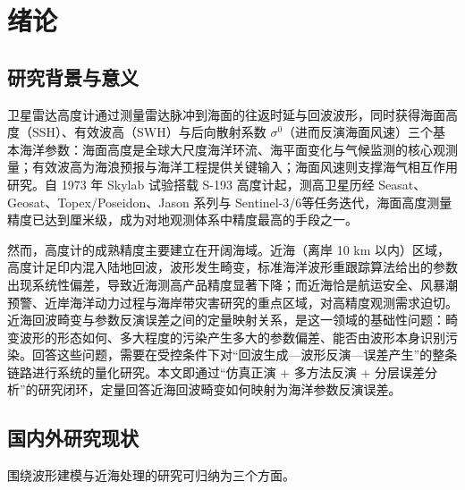 \documentclass[a4paper]{article}
\newcommand{\song}{\CJKfamily{song}}
\newcommand{\xiaosihao}{\fontsize{12pt}{18pt}\selectfont}
\newcommand\seccontent{
	\song
	\xiaosihao
    \setlength{\parindent}{2em}
    \setlength{\parskip}{0pt}
    }
\begin{document}
\clearpage
\setcounter{page}{1}
\renewcommand{\thepage}{\arabic{page}}

\seccontent

\section{绪论}
\label{chap:intro}

\subsection{研究背景与意义}
\label{sec:background}
卫星雷达高度计通过测量雷达脉冲到海面的往返时延与回波波形，同时获得海面高度（SSH）、有效波高（SWH）与后向散射系数 $\sigma^0$（进而反演海面风速）三个基本海洋参数\cite{chelton2001}：海面高度是全球大尺度海洋环流、海平面变化与气候监测的核心观测量；有效波高为海浪预报与海洋工程提供关键输入；海面风速则支撑海气相互作用研究。自 1973 年 Skylab 试验搭载 S-193 高度计\cite{mcgoogan1974}起，测高卫星历经 Seasat\cite{tapley1982}、Geosat\cite{macarthur1987}、Topex/Poseidon\cite{fu1994}、Jason 系列\cite{menard2003,beckley2010,zaouche2010}与 Sentinel-3/6\cite{donlon2012}等任务迭代，海面高度测量精度已达到厘米级，成为对地观测体系中精度最高的手段之一。

然而，高度计的成熟精度主要建立在开阔海域。近海（离岸 10 km 以内）区域，高度计足印内混入陆地回波，波形发生畸变，标准海洋波形重跟踪算法给出的参数出现系统性偏差，导致近海测高产品精度显著下降\cite{vignudelli2011,deng2006}；而近海恰是航运安全、风暴潮预警、近岸海洋动力过程与海岸带灾害研究的重点区域，对高精度观测需求迫切。近海回波畸变与参数反演误差之间的定量映射关系，是这一领域的基础性问题：畸变波形的形态如何、多大程度的污染产生多大的参数偏差、能否由波形本身识别污染。回答这些问题，需要在受控条件下对“回波生成—波形反演—误差产生”的整条链路进行系统的量化研究。本文即通过“仿真正演 + 多方法反演 + 分层误差分析”的研究闭环，定量回答近海回波畸变如何映射为海洋参数反演误差。

\subsection{国内外研究现状}
\label{sec:related}
围绕波形建模与近海处理的研究可归纳为三个方面。
\end{document}
